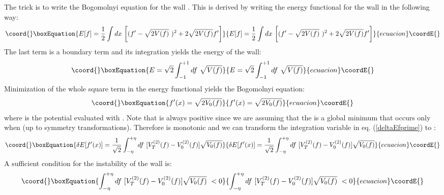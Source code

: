 \documentclass[a4paper,prd,nofootinbib,twocolumn,showpacs]{revtex4}
\begin{document}
The trick is to write the Bogomolnyi equation for the \coordHE{}
wall \cite{Bog76}. This is derived
by writing the energy functional for the \coordHE{} wall in the 
following way:
\begin{equation}\coord{}\boxEquation{
E[f] = {1\over 2}\int dx ~ \biggl [ (f' - \sqrt{2V(f)} ~ )^2
                         + 2\sqrt{2V(f)} f' \biggr ]
\label{towardsbogo}
}{
E[f] = {1\over 2}\int dx ~ \biggl [ (f' - \sqrt{2V(f)} ~ )^2
                         + 2\sqrt{2V(f)} f' \biggr ]
}{ecuacion}\coordE{}\end{equation}
The last term is a boundary term and its integration yields
the energy of the \coordHE{} wall:
\begin{equation}\coord{}\boxEquation{
E = \sqrt{2} \int_{-1}^{+1} df ~ \sqrt{V(f)}
\label{bogoenergy}
}{
E = \sqrt{2} \int_{-1}^{+1} df ~ \sqrt{V(f)}
}{ecuacion}\coordE{}\end{equation}
Minimization of the whole square term in the energy functional
yields the Bogomolnyi equation:
\begin{equation}\coord{}\boxEquation{
f'(x) = \sqrt{2 V_0 (f)}
\label{bogoeq}
}{
f'(x) = \sqrt{2 V_0 (f)}
}{ecuacion}\coordE{}\end{equation}
where \coordHE{} is the potential evaluated with \coordHE{}.
Note that \coordHE{} is always positive since we are assuming that
the \coordHE{} is a global minimum that occurs only when
\coordHE{} (up to symmetry transformations). Therefore \coordHE{}
is monotonic and we can transform the integration variable in
eq. (\ref{deltaEfprime}) to \coordHE{}:
\begin{equation}\coord{}\boxEquation{
\delta E [ f'(x) ] = 
 {1\over {\sqrt{2}}} \int_{-\eta}^{+\eta} df ~
                   [ V_T^{(2)} (f) - V_0^{(2)} (f) ] \sqrt{V_0 (f)}
\label{deltaEfprimewrtf}
}{
\delta E [ f'(x) ] = 
 {1\over {\sqrt{2}}} \int_{-\eta}^{+\eta} df ~
                   [ V_T^{(2)} (f) - V_0^{(2)} (f) ] \sqrt{V_0 (f)}
}{ecuacion}\coordE{}\end{equation}
A sufficient condition for the instability of the \coordHE{} wall is:
\begin{equation}\coord{}\boxEquation{
 \int_{-\eta}^{+\eta} df ~ 
        [ V_T^{(2)} (f) - V_0^{(2)} (f) ] \sqrt{V_0 (f)} ~ < 0
\label{instabilitycondition}
}{
 \int_{-\eta}^{+\eta} df ~ 
        [ V_T^{(2)} (f) - V_0^{(2)} (f) ] \sqrt{V_0 (f)} ~ < 0
}{ecuacion}\coordE{}\end{equation}
\end{document}
